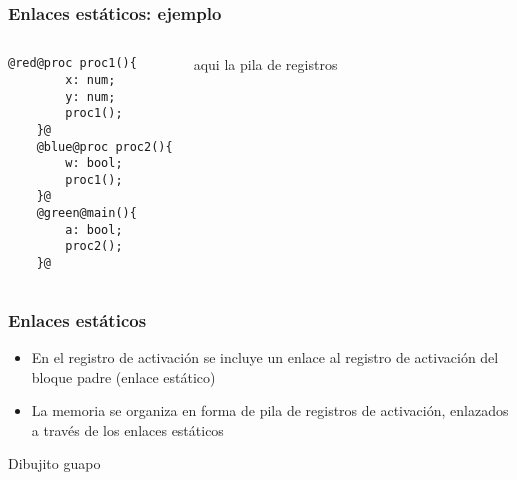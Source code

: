 \documentclass[hyperref={pdfpagelabels=false},tree-dvips]{beamer}
\begin{document}
\begin{frame}[fragile] %
\frametitle{Enlaces estáticos: ejemplo}

\begin{columns}[T]
	\begin{lstlisting}[style=procesos]
	@red@proc proc1(){
	    x: num;
	    y: num;
	    proc1();
	}@
	@blue@proc proc2(){
	    w: bool;
	    proc1();
	}@
	@green@main(){
	    a: bool;
	    proc2();
	}@
	\end{lstlisting}
	aqui la pila de registros
\end{columns}

\end{frame}
\begin{frame}[fragile]
\frametitle{Enlaces estáticos}
\begin{itemize}%
	\item En el registro de activación se incluye un enlace al registro de activación del bloque padre (enlace estático)
	\item La memoria se organiza en forma de pila de registros de activación, enlazados a través de los enlaces estáticos
\end{itemize}

Dibujito guapo

\end{frame}
\end{document}
